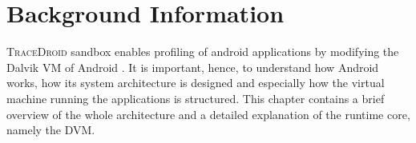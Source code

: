 \chapter{Background Information}
\label{chap:background}

\textsc{TraceDroid} sandbox enables profiling of android applications by
modifying the Dalvik VM of Android \cite{ref1}. It is important, hence, to
understand how Android works, how its system architecture is designed
and especially how the virtual machine running the applications is
structured. This chapter contains a brief overview of the whole
architecture and a detailed explanation of the runtime core, namely
the DVM.
